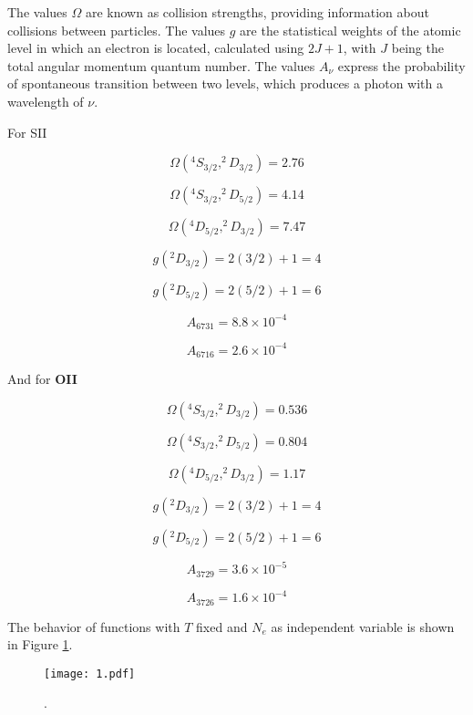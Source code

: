 \documentclass{article}
\begin{document}
The values $\Omega$ are known as collision strengths, providing information about collisions between particles. The values $g$ are the statistical weights of the atomic level in which an electron is located, calculated using $2J + 1$, with $J$ being the total angular momentum quantum number. The values $A_\nu$ express the probability of spontaneous transition between two levels, which produces a photon with a wavelength of $\nu$.

For SII

\[
\Omega(^4S_{3/2}, ^2D_{3/2}) = 2.76
\]

\[
\Omega(^4S_{3/2}, ^2D_{5/2}) = 4.14
\]

\[
\Omega(^4D_{5/2}, ^2D_{3/2}) = 7.47
\]

\[
g(^2D_{3/2}) = 2(3/2) + 1 = 4
\]

\[
g(^2D_{5/2}) = 2(5/2) + 1 = 6
\]

\[
A_{6731} = 8.8 \times 10^{-4}
\]

\[
A_{6716} = 2.6 \times 10^{-4}
\]

\noindent
And for \textbf{OII}

\[
\Omega(^4S_{3/2}, ^2D_{3/2}) = 0.536
\]

\[
\Omega(^4S_{3/2}, ^2D_{5/2}) = 0.804
\]

\[
\Omega(^4D_{5/2}, ^2D_{3/2}) = 1.17
\]

\[
g(^2D_{3/2}) = 2(3/2) + 1 = 4
\]

\[
g(^2D_{5/2}) = 2(5/2) + 1 = 6
\]

\[
A_{3729} = 3.6 \times 10^{-5}
\]

\[
A_{3726} = 1.6 \times 10^{-4}
\]

The behavior of functions with $T$ fixed and $N_e$ as independent variable is shown in Figure \ref{1}.

\begin{figure}[!h]
  \centering
  \texttt{[image: 1.pdf]}
  \caption{.}
  \label{1}
\end{figure}
\end{document}
